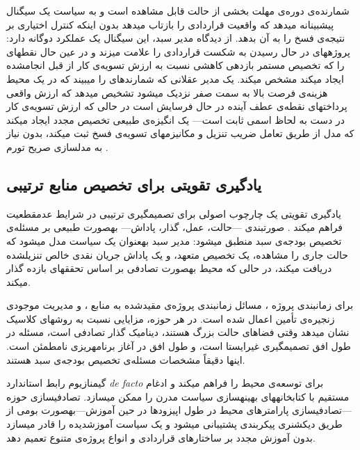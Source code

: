 شمارنده‌ی دوره‌ی مهلت بخشی از حالت قابل مشاهده است
و به سیاست یک سیگنال پیش\zwnj{}بینانه می\zwnj{}دهد
که واقعیت قراردادی را بازتاب می\zwnj{}دهد
بدون اینکه کنترل اختیاری بر نتیجه‌ی فسخ را به آن بدهد.
از دیدگاه مدیر سبد، این سیگنال یک عملکرد دوگانه دارد:
پروژه\zwnj{}های در حال رسیدن به شکست قراردادی را علامت می\zwnj{}زند
و در عین حال نقطه\zwnj{}ای را که تخصیص مستمر
بازدهی کاهشی نسبت به ارزش تسویه‌ی کار
از قبل انجام\zwnj{}شده ایجاد می\zwnj{}کند مشخص می\zwnj{}کند.
یک مدیر عقلانی که شمارنده\zwnj{}ای را می\zwnj{}بیند که در یک محیط
هزینه‌ی فرصت بالا به سمت صفر نزدیک می\zwnj{}شود
تشخیص می\zwnj{}دهد که ارزش واقعی پرداخت\zwnj{}های نقطه‌ی عطف آینده
در حال فرسایش است در حالی که ارزش تسویه‌ی کار در دست
به لحاظ اسمی ثابت است---
یک انگیزه‌ی طبیعی تخصیص مجدد ایجاد می\zwnj{}کند که مدل
از طریق تعامل ضریب تنزیل و مکانیزم\zwnj{}های تسویه‌ی فسخ ثبت می\zwnj{}کند،
بدون نیاز به مدل\zwnj{}سازی صریح تورم
\citep{Dixit1994, FIDIC2017}.

\subsection{یادگیری تقویتی برای تخصیص منابع ترتیبی}
\label{subsec:lr_rl}

یادگیری تقویتی یک چارچوب اصولی برای تصمیم\zwnj{}گیری ترتیبی
در شرایط عدم\zwnj{}قطعیت فراهم می\zwnj{}کند \citep{Sutton2018}.
صورت\zwnj{}بندی ---حالت، عمل، گذار، پاداش---
به\zwnj{}صورت طبیعی بر مسئله‌ی تخصیص بودجه‌ی سبد منطبق می\zwnj{}شود:
مدیر سبد به\zwnj{}عنوان یک سیاست مدل می\zwnj{}شود که حالت جاری را مشاهده،
یک تخصیص متعهد، و یک پاداش جریان نقدی خالص تنزیل\zwnj{}شده دریافت می\zwnj{}کند،
در حالی که محیط به\zwnj{}صورت تصادفی بر اساس تحقق\zwnj{}های بازده گذار می\zwnj{}کند.

 برای زمان\zwnj{}بندی پروژه \citep{Peng2021, Liu2023}،
مسائل زمان\zwnj{}بندی پروژه‌ی مقیدشده به منابع \citep{Tassel2023}،
و مدیریت موجودی زنجیره‌ی تأمین \citep{Giannoccaro2002} اعمال شده است.
در هر حوزه،  مزایایی نسبت به روش\zwnj{}های کلاسیک 
نشان می\zwnj{}دهد وقتی فضاهای حالت بزرگ هستند،
دینامیک گذار تصادفی است، مسئله در طول افق تصمیم\zwnj{}گیری غیرایستا است،
و طول افق در آغاز برنامه\zwnj{}ریزی نامطمئن است.
اینها دقیقاً مشخصات مسئله‌ی تخصیص بودجه‌ی سبد هستند.

 گیمنازیوم \citep{Towers2024} رابط استاندارد \textit{de facto}
برای توسعه‌ی محیط  را فراهم می\zwnj{}کند
و ادغام مستقیم با کتابخانه\zwnj{}های بهینه\zwnj{}سازی سیاست مدرن را ممکن می\zwnj{}سازد.
تصادفی\zwnj{}سازی حوزه \citep{Tobin2017}---تصادفی\zwnj{}سازی پارامترهای محیط
در طول اپیزودها در حین آموزش---به\zwnj{}صورت بومی از طریق
دیکشنری پیکربندی پشتیبانی می\zwnj{}شود
و یک سیاست آموزش\zwnj{}دیده را قادر می\zwnj{}سازد بدون آموزش مجدد
بر ساختارهای قراردادی و انواع پروژه‌ی متنوع تعمیم دهد.

